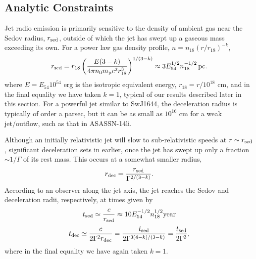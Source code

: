 \documentclass[usenatbib,fleqn]{mnras}
\begin{document}
\subsection{Analytic Constraints}
\label{sec:analy}


Jet radio emission is primarily sensitive to the density of
ambient gas near the Sedov radius, $r_{\rm sed}$, outside of which the jet has
swept up a gaseous mass exceeding its own. For a power law gas density
profile, $n= n_{18} \left(r/r_{18}\right)^{-k}$,
\begin{equation}
  r_{\rm sed} = r_{18} \left( \frac{E(3-k)}{4\pi n_{0}
      m_{\rm p} c^2 r_{18}^3} \right)^{1/(3-k)} \approx 3 E_{54}^{1/2} n_{\rm 18}^{-1/2}\,{\rm pc}. 
  \label{eq:rdec}
\end{equation}
where $E = E_{54}10^{54}$ erg is the isotropic equivalent energy,
$r_{18} = r/10^{18}$ cm, and in the final equality we have taken $k =
1$, typical of our results described later in this section.  For a powerful jet similar to SwJ1644, the deceleration radius is
typically of order a parsec, but it can be as small as $10^{16}$ cm for a weak jet/outflow, such as that in ASASSN-14li.

Although an initially relativistic jet will slow to sub-relativistic speeds at
$r \sim r_{\rm sed}$, significant deceleration sets in earlier, once the
jet has swept up only a fraction $\sim 1/\Gamma$ of its rest mass.  This occurs at a somewhat smaller radius,
\begin{equation}
  r_{\rm dec}=\frac{r_{\rm sed}}{\Gamma^{2/(3-k)}}.
  \label{eq:rdec2}
\end{equation}
According to an observer along the jet axis, the jet reaches the Sedov and deceleration radii, respectively, at times given by
\begin{equation}
t_{\rm sed} \simeq \frac{c}{r_{\rm sed}} \approx
10 E_{54}^{-1/2}n_{18}^{1/2} {\rm year}
 \end{equation} 
\begin{equation}
t_{\rm dec} \simeq
\frac{c}{2\Gamma^{2} r_{\rm dec}} = \frac{t_{\rm
    sed}}{2\Gamma^{3(4-k)/(3-k)}} = \frac{t_{\rm sed}}{2\Gamma^{3}},
 \label{eq:tdec}
\end{equation}
%
where in the final equality we have again taken $k = 1$.
\end{document}
